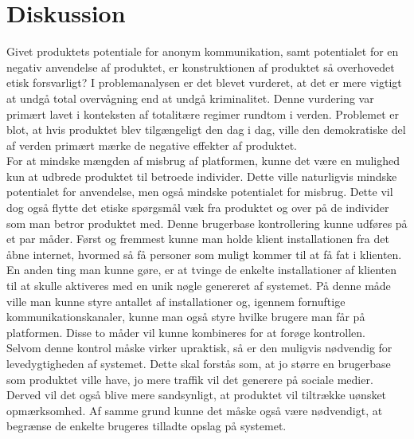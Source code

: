 \section{Diskussion}
Givet produktets potentiale for anonym kommunikation, samt potentialet for en negativ anvendelse af produktet, er konstruktionen af produktet så overhovedet etisk forsvarligt? I problemanalysen er det blevet vurderet, at det er mere vigtigt at undgå total overvågning end at undgå kriminalitet. Denne vurdering var primært lavet i konteksten af totalitære regimer rundtom i verden. Problemet er blot, at hvis produktet blev tilgængeligt den dag i dag, ville den demokratiske del af verden primært mærke de negative effekter af produktet.\\
For at mindske mængden af misbrug af platformen, kunne det være en mulighed kun at udbrede produktet til betroede individer. Dette ville naturligvis mindske potentialet for anvendelse, men også mindske potentialet for misbrug. Dette vil dog også flytte det etiske spørgsmål væk fra produktet og over på de individer som man betror produktet med. 
Denne brugerbase kontrollering kunne udføres på et par måder. Først og fremmest kunne man holde klient installationen fra det åbne internet, hvormed så få personer som muligt kommer til at få fat i klienten. En anden ting man kunne gøre, er at tvinge de enkelte installationer af klienten til at skulle aktiveres med en unik nøgle genereret af systemet. På denne måde ville man kunne styre antallet af installationer og, igennem fornuftige kommunikationskanaler, kunne man også styre hvilke brugere man får på platformen. Disse to måder vil kunne kombineres for at forøge kontrollen.\\
Selvom denne kontrol måske virker upraktisk, så er den muligvis nødvendig for levedygtigheden af systemet. Dette skal forstås som, at jo større en brugerbase som produktet ville have, jo mere traffik vil det generere på sociale medier. Derved vil det også blive mere sandsynligt, at produktet vil tiltrække uønsket opmærksomhed. Af samme grund kunne det måske også være nødvendigt, at begrænse de enkelte brugeres tilladte opslag på systemet.


